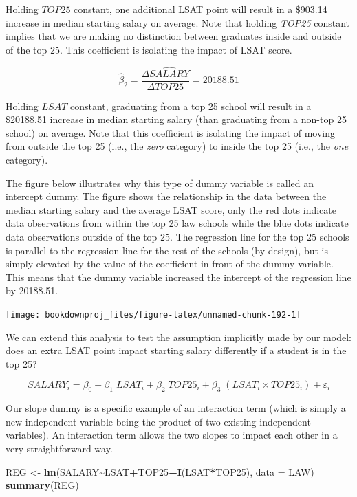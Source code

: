 \documentclass[
]{book}
\newenvironment{Shaded}{\begin{snugshade}}{\end{snugshade}}
\newcommand{\AttributeTok}[1]{\textcolor[rgb]{0.13,0.29,0.53}{#1}}
\newcommand{\FunctionTok}[1]{\textcolor[rgb]{0.13,0.29,0.53}{\textbf{#1}}}
\newcommand{\NormalTok}[1]{#1}
\newcommand{\OtherTok}[1]{\textcolor[rgb]{0.56,0.35,0.01}{#1}}
\newcommand{\SpecialCharTok}[1]{\textcolor[rgb]{0.81,0.36,0.00}{\textbf{#1}}}
\begin{document}
Holding \(TOP25\) constant, one additional LSAT point will result in a \$903.14 increase in median starting salary on average. Note that holding \emph{TOP25} constant implies that we are making no distinction between graduates inside and outside of the top 25. This coefficient is isolating the impact of LSAT score.

\[\hat{\beta}_2 = \frac{\Delta \widehat{SALARY}}{\Delta TOP25} =  20188.51\]

Holding \(LSAT\) constant, graduating from a top 25 school will result in a \$20188.51 increase in median starting salary (than graduating from a non-top 25 school) on average. Note that this coefficient is isolating the impact of moving from outside the top 25 (i.e., the \emph{zero} category) to inside the top 25 (i.e., the \emph{one} category).

The figure below illustrates why this type of dummy variable is called an intercept dummy. The figure shows the relationship in the data between the median starting salary and the average LSAT score, only the red dots indicate data observations from within the top 25 law schools while the blue dots indicate data observations outside of the top 25. The regression line for the top 25 schools is parallel to the regression line for the rest of the schools (by design), but is simply elevated by the value of the coefficient in front of the dummy variable. This means that the dummy variable increased the intercept of the regression line by 20188.51.

\begin{center}\texttt{[image: bookdownproj\_files/figure-latex/unnamed-chunk-192-1]} \end{center}

We can extend this analysis to test the assumption implicitly made by our model: does an extra LSAT point impact starting salary differently if a student is in the top 25?

\[SALARY_i = \beta_0 + \beta_1 \; LSAT_i + \beta_2 \; TOP25_i + \beta_3 \; (LSAT_i \times TOP25_i) + \varepsilon_i\]

Our slope dummy is a specific example of an interaction term (which is simply a new independent variable being the product of two existing independent variables). An interaction term allows the two slopes to impact each other in a very straightforward way.

\begin{Shaded}
\begin{Highlighting}[]
\NormalTok{REG }\OtherTok{\textless{}{-}} \FunctionTok{lm}\NormalTok{(SALARY}\SpecialCharTok{\textasciitilde{}}\NormalTok{LSAT}\SpecialCharTok{+}\NormalTok{TOP25}\SpecialCharTok{+}\FunctionTok{I}\NormalTok{(LSAT}\SpecialCharTok{*}\NormalTok{TOP25), }\AttributeTok{data =}\NormalTok{ LAW)}
\FunctionTok{summary}\NormalTok{(REG)}
\end{Highlighting}
\end{Shaded}
\end{document}
